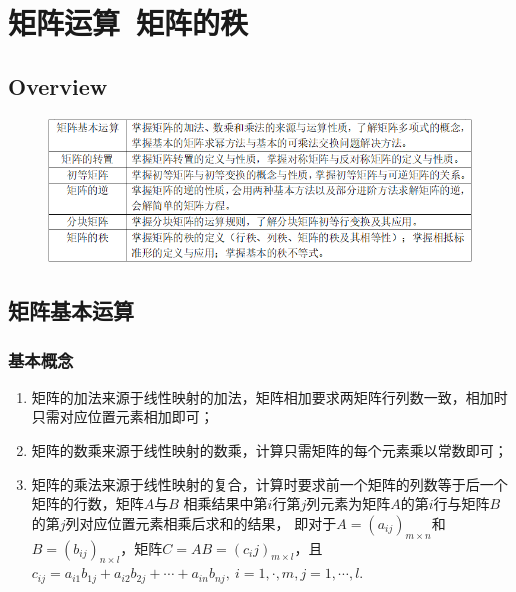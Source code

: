 \chapter{矩阵运算\ 矩阵的秩}

\section{Overview}
\begin{figure}[h]
	\centering
	\includegraphics[scale=0.58]{4.png}
\end{figure}

\section{矩阵基本运算}
\subsection{基本概念}
\begin{enumerate}
	\item 矩阵的加法来源于线性映射的加法，矩阵相加要求两矩阵行列数一致，相加时只需对应位置元素相加即可；
	\item 矩阵的数乘来源于线性映射的数乘，计算只需矩阵的每个元素乘以常数即可；
	\item 矩阵的乘法来源于线性映射的复合，计算时要求前一个矩阵的列数等于后一个矩阵的行数，矩阵$A$与$B$
	相乘结果中第$i$行第$j$列元素为矩阵$A$的第$i$行与矩阵$B$的第$j$列对应位置元素相乘后求和的结果，
	即对于$A=(a_{ij})_{m \times n}$和$B=(b_{ij})_{n \times l}$，矩阵$C=AB=(c_ij)_{m \times l}$，且
	$c_{ij}=a_{i1}b_{1j}+a_{i2}b_{2j}+\cdots+a_{in}b_{nj},\ i=1,\cdot,m,j=1,\cdots,l$.
\end{enumerate}

